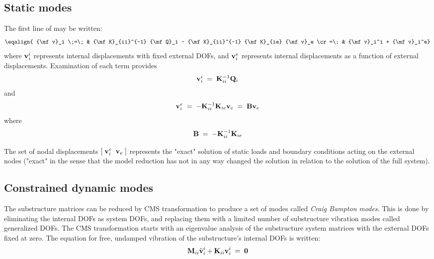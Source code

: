 \subsection{Static modes}
\label{subsec:Static modes}

The first line of  may be written:
%
\begin{equation}
\eqalign{
{\mf v}_i \;=\; & {\mf K}_{ii}^{-1} {\mf Q}_i
                - {\mf K}_{ii}^{-1} {\mf K}_{ie} {\mf v}_e \cr =\; &
{\mf v}_i^i + {\mf v}_i^e}
\label{eqCMS:42}
\end{equation}
%
where ${\bf v}_i^i$ represents internal displacements with fixed external DOFs,
and ${\bf v}_i^e$ represents internal displacements as a function of external
displacements.
Examination of each term provides
%
\begin{equation}
{\bf v}_i^i \;=\; {\bf K}_{ii}^{-1} {\bf Q}_i
\label{eqCMS:43}
\end{equation}
%
and
%
\begin{equation}
{\bf v}_i^e \;=\; -{\bf K}_{ii}^{-1}{\bf K}_{ie}{\bf v}_e \;=\; {\bf B}{\bf v}_e
\label{eqCMS:44}
\end{equation}
%
where
%
\begin{equation}
{\bf B} \;=\; -{\bf K}_{ii}^{-1} {\bf K}_{ie}
\label{eqCMS:45}
\end{equation}

The set of nodal displacements $[\;{\bf v}_i^e \;\; {\bf v}_e\;]$ represents the
"exact" solution of static loads and boundary conditions acting on the external
nodes ("exact" in the sense that the model reduction has not in any way changed
the solution in relation to the solution of the full system).

\subsection{Constrained dynamic modes}
\label{secCMS:FixeIntMode}

The substructure matrices can be reduced by CMS transformation to produce a set of modes called
{\it Craig Bampton modes}. This is done by eliminating the internal DOFs as system DOFs, and
replacing them with a limited number of substructure vibration modes called generalized DOFs.
The CMS transformation starts with an eigenvalue analysis of the substructure system matrices
with the external DOFs fixed at zero. The equation for free, undamped vibration of the substructure's
internal DOFs is written:
%
\begin{equation}
{\bf M}_{ii} \ddot{\bf v}_i^i + {\bf K}_{ii} {\bf v}_i^i \;=\; {\bf 0}
\label{eqCMS:46}
\end{equation}


